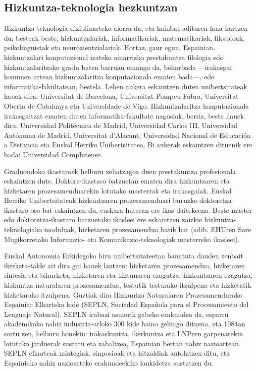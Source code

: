 \begin{multicols}{2}
\subsection{Hizkuntza-teknologia hezkuntzan}
   Hizkuntza-teknologia diziplinarteko alorra da, eta hainbat adituren lana hartzen du; besteak beste, hizkuntzalariak, informatikariak, matematikariak, filosofoak, psikolinguistak eta neurozientzialariak. Hortaz, gaur egun, Espainian, hizkuntzalari konputazional izateko oinarrizko prestakuntza filologia edo hizkuntzalaritzako gradu baten barruan emango da, beharbada —irakasgai komunen artean hizkuntzalaritza konputazionala ematen bada—, edo informatika-fakultatean, bestela. Lehen aukera eskaintzen duten unibertsitateak hauek dira: Universitat de Barcelona, Universitat Pompeu Fabra, Universitat Oberta de Catalunya eta Universidade de Vigo. Hizkuntzalaritza konputazionala irakasgaitzat ematen duten informatika-fakultate nagusiak, berriz, beste hauek dira: Universidad Politécnica de Madrid, Universidad Carlos III, Universidad Autónoma de Madrid, Universitat d’Alacant, Universidad Nacional de Educación a Distancia eta Euskal Herriko Unibertsitatea. Bi aukerak eskaintzen dituenik ere bada: Universidad Complutense.

Graduondoko ikastaroek helburu zehatzagoa duen prestakuntza profesionala eskaintzen dute. Doktore-ikastaro batzuetan ematen dira hizkuntzaren eta hizketaren prozesamenduarekin lotutako masterrak eta irakasgaiak. Euskal Herriko Unibertsitateak hizkuntzaren prozesamenduari buruzko doktoretza-ikastaro oso bat eskaintzen du, euskara hutsean ere ikas daitekeena. Beste master edo doktoretza-ikastaro batzuetako ikasleei ere eskaintzen zaizkie hizkuntza-teknologiako moduluak, hizketaren prozesamendua batik bat (adib. EHUren Sare Mugikorretako Informazio- eta Komunikazio-teknologiak masterreko ikasleei). 

Euskal Autonomia Erkidegoko hiru unibertsitateetan banatuta dauden zenbait ikerketa-talde ari dira gai hauek lantzen: hizketaren prozesamendua, hizketaren sintesia eta bihurketa, hizketaren eta hiztunaren ezagutza, hizkuntzaren ezagutza, hizkuntza naturalaren prozesamendua, testutik testurako itzulpena eta hizketatik hizketarako itzulpena. Guztiak dira Hizkuntza Naturalaren Prozesamendurako Espainiar Elkarteko kide (SEPLN, Sociedad Española para el Procesamiento del Lenguaje Natural). SEPLN irabazi asmorik gabeko erakundea da, esparru akademikoko nahiz industria-arloko 300 kide baino gehiago dituena, eta 1984an sortu zen, helburu honekin: irakaskuntza, ikerkuntza eta LNPren garpenarekin lotutako jarduerak sustatu eta zabaltzea, Espainian bertan nahiz nazioartean. SEPLN elkarteak mintegiak, sinposioak eta hitzaldiak antolatzen ditu, eta Espainiako nahiz nazioarteko erakundeekiko lankidetza sustatzen du.


\end{multicols}
